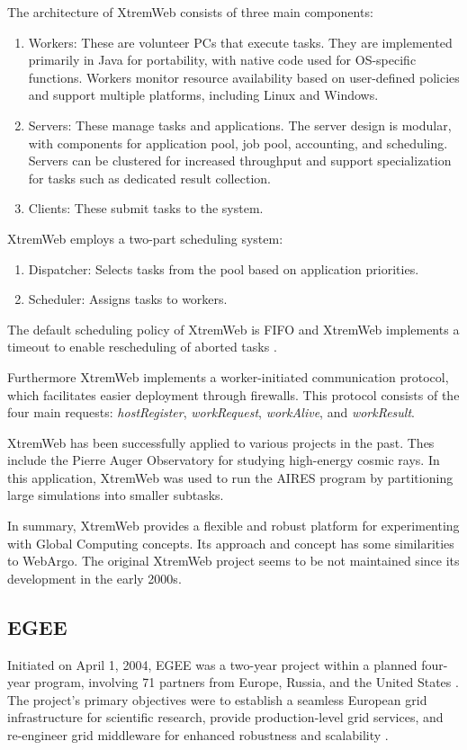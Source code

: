 The architecture of XtremWeb consists of three main components:
\begin{enumerate}
  \item Workers: These are volunteer PCs that execute tasks. They are implemented primarily in Java for portability, with native code used for OS-specific functions. Workers monitor resource availability based on user-defined policies and support multiple platforms, including Linux and Windows.
  \item Servers: These manage tasks and applications. The server design is modular, with components for application pool, job pool, accounting, and scheduling. Servers can be clustered for increased throughput and support specialization for tasks such as dedicated result collection.
  \item Clients: These submit tasks to the system.
\end{enumerate}
XtremWeb employs a two-part scheduling system:
\begin{enumerate}
  \item Dispatcher: Selects tasks from the pool based on application priorities.
  \item Scheduler: Assigns tasks to workers.
\end{enumerate}
The default scheduling policy of XtremWeb is \ac{FIFO} and XtremWeb implements a timeout to enable rescheduling of aborted tasks \cite{relatedwork:xtremweb}.

Furthermore XtremWeb implements a worker-initiated communication protocol, which facilitates easier deployment through firewalls. This protocol consists of the four main requests: \emph{hostRegister}, \emph{workRequest}, \emph{workAlive}, and \emph{workResult}. \cite{relatedwork:xtremweb}

XtremWeb has been successfully applied to various projects in the past. Thes include the Pierre Auger Observatory for studying high-energy cosmic rays. In this application, XtremWeb was used to run the \ac{AIRES} program by partitioning large simulations into smaller subtasks. \cite{relatedwork:xtremweb}

In summary, XtremWeb provides a flexible and robust platform for experimenting with Global Computing concepts. Its approach and concept has some similarities to WebArgo. The original XtremWeb project seems to be not maintained since its development in the early 2000s.

\subsection{EGEE}
\label{subsec:background:related_work:egee}
Initiated on April 1, 2004, \ac{EGEE} was a two-year project within a planned four-year program, involving 71 partners from Europe, Russia, and the United States \cite{relatedwork:egee}. The project's primary objectives were to establish a seamless European grid infrastructure for scientific research, provide production-level grid services, and re-engineer grid middleware for enhanced robustness and scalability \cite{relatedwork:egee}.


